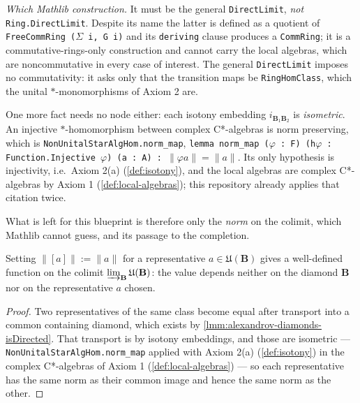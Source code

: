 \emph{Which Mathlib construction.} It must be the general \texttt{DirectLimit}, \emph{not} \texttt{Ring.DirectLimit}. Despite its name the latter is defined as a quotient of \texttt{FreeCommRing (\ensuremath{\Sigma} i, G i)} and its \texttt{deriving} clause produces a \texttt{CommRing}; it is a commutative-rings-only construction and cannot carry the local algebras, which are noncommutative in every case of interest. The general \texttt{DirectLimit} imposes no commutativity: it asks only that the transition maps be \texttt{RingHomClass}, which the unital $*$-monomorphisms of Axiom 2 are.

One more fact needs no node either: each isotony embedding $i_{\mathbf{B}_1\mathbf{B}_2}$ is \emph{isometric}. An injective $*$-homomorphism between complex C*-algebras is norm preserving, which is \texttt{NonUnitalStarAlgHom.norm\_map}, \texttt{lemma norm\_map (\ensuremath{\varphi} : F) (h\ensuremath{\varphi} : Function.Injective \ensuremath{\varphi}) (a : A) : \ensuremath{\|\varphi a\| = \|a\|}}. Its only hypothesis is injectivity, i.e.\ Axiom 2(a) (\ref{def:isotony}), and the local algebras are complex C*-algebras by Axiom 1 (\ref{def:local-algebras}); this repository already applies that citation twice.

What is left for this blueprint is therefore only the \emph{norm} on the colimit, which Mathlib cannot guess, and its passage to the completion.

\begin{lemma}
    \label{lmm:quasilocal-colimit-norm-well-defined}
    \leanok
    Setting $\|[a]\| := \|a\|$ for a representative $a \in \mathfrak{U}(\mathbf{B})$ gives a well-defined function on the colimit $\varinjlim_{\mathbf{B}} \mathfrak{U}(\mathbf{B})$: the value depends neither on the diamond $\mathbf{B}$ nor on the representative $a$ chosen.
\end{lemma}
\begin{proof}
    \leanok
    Two representatives of the same class become equal after transport into a common containing diamond, which exists by \ref{lmm:alexandrov-diamonds-isDirected}. That transport is by isotony embeddings, and those are isometric --- \texttt{NonUnitalStarAlgHom.norm\_map} applied with Axiom 2(a) (\ref{def:isotony}) in the complex C*-algebras of Axiom 1 (\ref{def:local-algebras}) --- so each representative has the same norm as their common image and hence the same norm as the other.
\end{proof}

